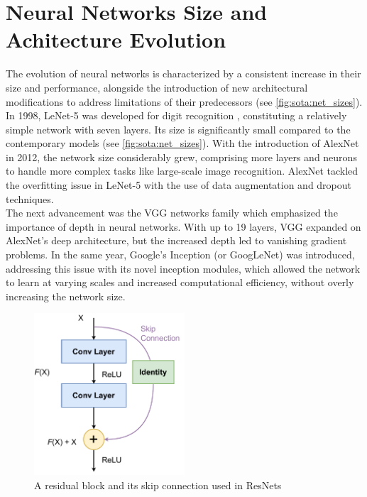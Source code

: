 \section{Neural Networks Size and Achitecture Evolution}\label{sec:sota:nn_evolution}

The evolution of neural networks is characterized by a consistent increase in
their size and performance, alongside the introduction of new architectural
modifications to address limitations of their predecessors (see
\cref{fig:sota:net_sizes}). In 1998, LeNet-5 was developed for digit recognition
\cite{DBLP:journals/pieee/LeCunBBH98}, constituting a relatively simple network
with seven layers. Its size is significantly small compared to the contemporary
models (see \cref{fig:sota:net_sizes}). With the introduction of AlexNet
\cite{DBLP:conf/nips/KrizhevskySH12} in 2012, the network size considerably
grew, comprising more layers and neurons to handle more complex tasks like
large-scale image recognition. AlexNet tackled the overfitting issue in LeNet-5
with the use of data augmentation and dropout techniques.\\


The next advancement was the VGG networks family
\cite{DBLP:journals/corr/SimonyanZ14a} %
which emphasized the importance of depth in neural networks. With up to 19
layers, VGG expanded on AlexNet's deep architecture, but the increased depth led
to vanishing gradient problems. In the same year, Google's Inception (or
GoogLeNet) \cite{DBLP:conf/cvpr/SzegedyLJSRAEVR15} was introduced, addressing
this issue with its novel inception modules, which allowed the network to learn
at varying scales and increased computational efficiency, without overly
increasing the network size.\\

\begin{figure}[htbp]
    \centering
    \includegraphics[width=0.5\textwidth]{chapter_sota/assets/skip_connection.pdf}
    \caption{A residual block and its skip connection used in
    ResNets\cite{DBLP:conf/cvpr/HeZRS16}}
    \label{fig:sota:skip_connection}
\end{figure}

